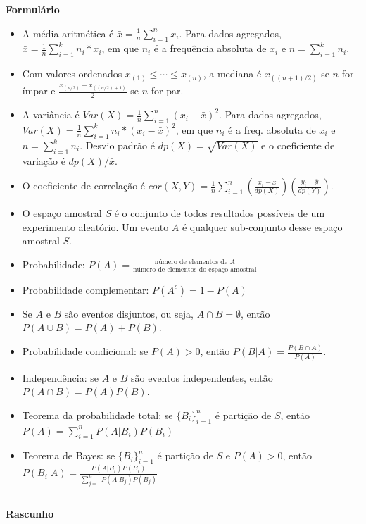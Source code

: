 \documentclass{article}
\begin{document}
\vspace{2cm}

\begin{center}
	\Large{\textbf{Formulário}}
\end{center}

\begin{small}
\begin{itemize}
	\item A média aritmética é $\bar{x} = \frac{1}{n} \sum_{i=1}^{n} x_i$. Para dados agregados, $\bar{x} = \frac{1}{n} \sum_{i=1}^{k} n_i * x_i$, em que $n_i$ é a frequência absoluta de $x_i$ e $n=\sum_{i=1}^k n_i$.
	\item Com valores ordenados $x_{(1)} \leq \cdots \leq x_{(n)}$, a mediana é $x_{((n+1)/2)}$ se $n$ for ímpar e $\frac{x_{(n/2)} + x_{((n/2) + 1)}}{2}$ se $n$ for par.
	\item A variância é $Var(X) = \frac{1}{n} \sum_{i=1}^n (x_i - \bar{x})^2$. Para dados agregados, $Var(X) = \frac{1}{n} \sum_{i=1}^k n_i * (x_i - \bar{x})^2$, em que $n_i$ é a freq. absoluta de $x_i$ e $n=\sum_{i=1}^k n_i$. Desvio padrão é $dp(X) = \sqrt{Var(X)}$ e o coeficiente de variação é $dp(X)/\bar{x}$.
	\item O coeficiente de correlação é $cor(X,Y) = \frac{1}{n} \sum_{i=1}^n \left( \frac{x_i - \bar{x}}{dp(X)} \right) \left( \frac{y_i - \bar{y}}{dp(Y)} \right)$.
	
	\item O espaço amostral $S$ é o conjunto de todos resultados possíveis de um experimento aleatório. Um evento $A$ é qualquer sub-conjunto desse espaço amostral $S$.
	\item Probabilidade: $P(A) = \frac{\text{número de elementos de $A$}}{\text{número de elementos do espaço amostral}}$
	\item Probabilidade complementar: $P(A^c) = 1 - P(A)$
	\item Se $A$ e $B$ são eventos disjuntos, ou seja, $A\cap B = \emptyset$, então $P(A \cup B) = P(A) + P(B)$.
	\item Probabilidade condicional: se $P(A)>0$, então $P(B|A) = \frac{P(B \cap A)}{P(A)}$.
	\item Independência: se $A$ e $B$ são eventos independentes, então $P(A \cap B) = P(A) P(B)$.
	\item Teorema da probabilidade total: se $\{B_i\}_{i=1}^n$ é partição de $S$, então $P(A) = \sum_{i=1}^n P(A|B_i) P(B_i)$
	\item Teorema de Bayes: se $\{B_i\}_{i=1}^n$ é partição de $S$ e $P(A)>0$, então $P(B_i | A) = \frac{P(A|B_i) P(B_i)}{\sum_{j=1}^n P(A|B_j) P(B_j)} $
\end{itemize}
\end{small}


\newpage
\begin{center}
	\noindent\rule{15cm}{0.4pt}
	\Large{\textbf{Rascunho}}
\end{center}
\end{document}
